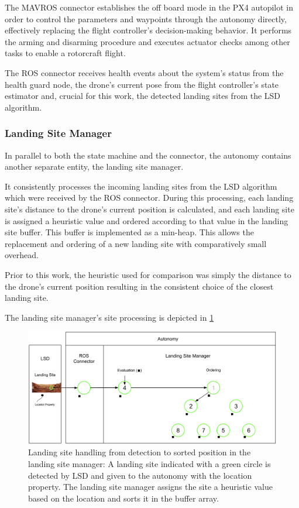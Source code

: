 The MAVROS connector establishes the off board mode in the PX4 autopilot in order to control the parameters and waypoints through the autonomy directly, effectively replacing the flight controller's decision-making behavior. It performs the arming and disarming procedure and executes actuator checks among other tasks to enable a rotorcraft flight.

The ROS connector receives health events about the system's status from the health guard node, the drone's current pose from the flight controller's state estimator and, crucial for this work, the detected landing sites from the LSD algorithm.

\subsubsection{Landing Site Manager}\label{subsubsec:LSM}

In parallel to both the state machine and the connector, the autonomy contains another separate entity, the landing site manager. 

It consistently processes the incoming landing sites from the LSD algorithm which were received by the ROS connector. During this processing, each landing site's distance to the drone's current position is calculated, and each landing site is assigned a heuristic value and ordered according to that value in the landing site buffer. This buffer is implemented as a min-heap. This allows the replacement and ordering of a new landing site with comparatively small overhead. 

Prior to this work, the heuristic used for comparison was simply the distance to the drone's current position resulting in the consistent choice of the closest landing site. 

The landing site manager's site processing is depicted in \cref{fig:lsm_ls_processing}

\begin{figure}[h]
\centering
\includegraphics[scale=0.165]{images/system_overview/lsm_handling.png}
\caption{Landing site handling from detection to sorted position in the landing site manager: A landing site indicated with a green circle is detected by LSD and given to the autonomy with the location property. The landing site manager assigns the site a heuristic value based on the location and sorts it in the buffer array.}
\label{fig:lsm_ls_processing}
\end{figure}

